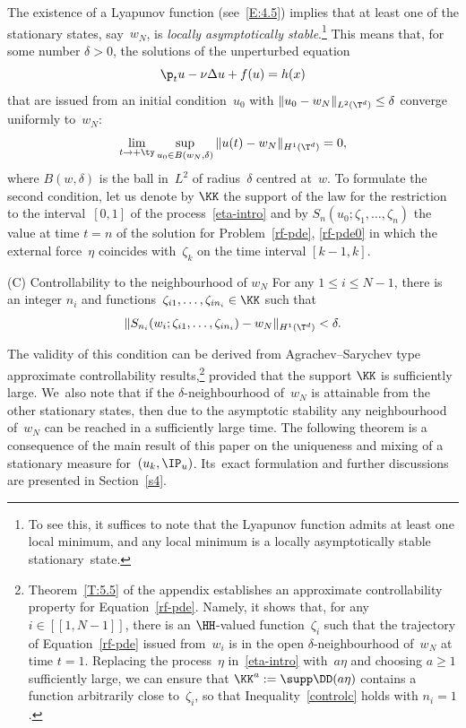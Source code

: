 The existence of a Lyapunov function (see~\eqref{E:4.5}) implies that at least one of the stationary states, say~$w_N$, is \emph{locally asymptotically stable}.\footnote{To see this, it suffices to note that the Lyapunov function admits at least one local minimum, and any local minimum is a locally asymptotically stable stationary~state.} This means that, for some number $\delta>0$, the solutions of the unperturbed equation
\begin{equation} \label{unperturbed-eq}
\p_t u-\nu\Delta u+f(u)=h(x)
\end{equation}
that are issued from an initial condition~$u_0$ with $\|u_0-w_N\|_{L^2(\T^d)} \le \delta$ converge uniformly to~$w_N$:
\begin{equation} \label{wNconvergence}
\lim_{t\to +\ty}\sup_{u_0\in B(w_N,\delta)}\|u(t)-w_N\|_{H^1(\T^d)}=0,
\end{equation}
where $B(w,\delta)$ is the ball in~$L^2$ of radius~$\delta$ centred at~$w$. To formulate the second condition, let us denote by $\KK$ the support of the law for the restriction to the interval~$[0,1]$ of the process~\eqref{eta-intro} and by $S_n(u_0;\zeta_1,\dots,\zeta_n)$ the value at time $t=n$ of the solution for Problem~\eqref{rf-pde}, \eqref{rf-pde0} in which the external force~$\eta$ coincides with~$\zeta_k$ on the time interval $[k-1,k]$.

\begin{enonce*}{\hypertarget{C}{(C)} Controllability to the neighbourhood of $w_N$}
For any $1\le i\le N-1$, there is an integer $n_i$ and functions~$\zeta_{i1},\dots,\zeta_{in_i}\in \KK$ such that \begin{equation}\label{controlc}
\|S_{n_i}(w_i;\zeta_{i1},\dots,\zeta_{in_i})-w_N\|_{H^1(\T^d)} < \delta.
\end{equation}
\end{enonce*}

The validity of this condition can be derived from Agrachev--Sarychev type approximate controllability results,\footnote{Theorem~\ref{T:5.5} of the appendix establishes an approximate controllability property for Equation~\eqref{rf-pde}. Namely, it shows that, for any $i\in[\![1,N-1]\!]$, there is an $\HH$-valued function~$\zeta_i$ such that the trajectory of Equation~\eqref{rf-pde} issued from~$w_i$ is in the open $\delta$-neighbourhood of~$w_N$ at time $t=1$. Replacing the process~$\eta$ in~\eqref{eta-intro} with~$a\eta$ and choosing $a\ge1$ sufficiently large, we can ensure that $\KK^a:=\supp \DD(a\eta)$ contains a function arbitrarily close to~$\zeta_i$, so that Inequality~\eqref{controlc} holds with $n_i=1$.} provided that the support $\KK$ is sufficiently large. We~also note that if the $\delta$-neighbourhood of~$w_N$ is attainable from the other stationary states, then due to the asymptotic stability any neighbourhood of~$w_N$ can be reached in a sufficiently large time. The following theorem is a consequence of the main result of this paper on the uniqueness and mixing of a stationary measure for~$(u_k,\IP_u)$. Its~exact formulation and further discussions are presented in Section~\ref{s4}.

